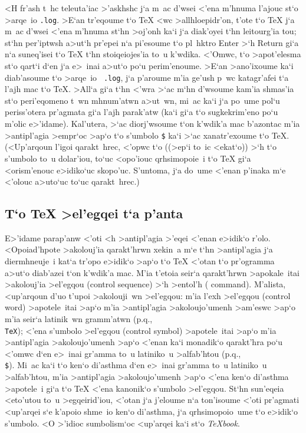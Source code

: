 \noindent
<H fr'ash t~hc teleuta'iac >'askhshc j`a m~ac d'wsei <'ena m'hnuma
l'ajouc st`o >arqe~io  {\tt .log}. >E`an tr'eqoume t`o {\rm \TeX} <wc
>allhloepidr'on, t'ote t`o {\rm \TeX} j`a m~ac d'wsei <'ena m'hnuma
st`hn >oj'onh ka`i j`a diak'oyei t`hn leitour\-g'ia tou; st`hn
per'iptwsh a>ut`h pr'epei n`a pi'esoume t`o pl~h\-ktro {\rm Enter} >`h 
{\rm Return} gi`a n`a suneq'isei t`o {\rm \TeX} t`hn stoiqeiojes'ia to~u
k'wdika.  <'Omwc, t`o >apot'elesma st`o qart`i d`en j`a e>~inai a>ut`o
po`u perim'enoume.  >E`an >ano'ixoume ka`i diab'asoume t`o >arqe~io {\tt
.log}, j`a p'aroume m'ia ge'ush p~wc katagr'afei t`a l'ajh mac t`o {\rm
\TeX}\null. >All`a gi`a t`hn <'wra >`ac m`hn d'wsoume kam'ia shmas'ia
st`o peri'e\-qomeno t~wn mhnum'atwn a>ut~wn, mi~ac ka`i j`a po~ume pol`u
periss'otera pr'agmata gi`a l'ajh parak'atw (ka`i gi`a t`o sugkekrim'eno
po`u m'olic e>'idame). Kal'utera, >`ac diorj'wsoume t`on k'wdik'a mac
b'azontac m'ia >anti\-pl'a\-gia >empr`oc >ap`o t`o s'umbolo {\tt \$}
ka`i >`ac xanatr'exoume t`o {\rm \TeX}\null. (<Up'arqoun l'igoi
qara\-kt~hrec, <'opwc t`o ((>ep`i to~ic <ekat`o)) >`h t`o s'umbolo to~u
dolar'iou, to`uc <opo'iouc qrhsi\-mopoie~i t`o {\rm \TeX} gi`a
<orism'enouc e>idiko`uc skopo'uc.  S'untoma, j`a do~ume <'enan
p'inaka m`e <'olouc a>uto`uc to`uc qarakt~hrec.)
\toindex{\$}

\subsection{T`o {\lsecfont \TeX} >el'egqei t`a p'anta}

E>'idame parap'anw <'oti <h >antipl'agia >'eqei <'enan e>idik`o r'olo.  
<Opoia\-d'hpote >akolouj'ia qa\-ra\-kt'hrwn xekin~a m`e t`hn
>antipl'agia j`a diermhneuje~i kat`a tr'opo e>idik`o >ap`o t`o {\rm
\TeX} <'otan t`o pr'ogramma a>ut`o diab'azei t`on k'wdik'a mac.  M'ia
t'etoia seir`a qarakt'hrwn >apokale~itai {\tengs >ako\-louj'ia
>el'egqou\/} ({\rm control sequence}) >`h {\tengs >entol'h\/} ({\rm
command}).  M'alista, <up'arqoun d'uo t'upoi >ako\-louji~wn >el'egqou:
m'ia {\tengs l'exh >el'egqou\/} ({\rm control word}) >apotele~itai >ap`o
m'ia >anti\-pl'a\-gia >ako\-lou\-jo'u\-menh >am'eswc >ap`o m'ia seir`a
latinik~wn gramm'atwn  (p.q., {\tt \\TeX}); <'ena {\tengs s'umbolo
>el'egqou\/} ({\rm control symbol}) >apotele~itai >ap`o m'ia
>anti\-pl'agia >ako\-lou\-jo'u\-menh >ap`o <'enan  ka`i monadik`o
qarakt'hra po`u <'omwc d`en e>~inai gr'amma to~u latiniko~u >alfab'htou
(p.q., {\tt \\\$})\null.  Mi~ac ka`i t`o ken`o di'a\-sthma d`en e>~inai
gr'amma to~u latiniko~u >alfab'htou, m'ia >antipl'agia
>ako\-lou\-jo'u\-menh >ap`o <'ena ken`o di'asthma >apotele~i gi`a t`o
{\rm \TeX} <'ena kanonik`o s'umbolo >el'egqou.
St`hn sun'eqeia <eto'utou to~u >egqeirid'iou, <'otan j`a j'e\-loume     
n`a ton'isoume <'oti pr'ag\-mati <up'ar\-qei s`e k'apoio shme~io ken`o  
di'asthma, j`a qrhsimopoio~ume t`o e>idik`o s'um\-bolo\NB {\tt\sp}\null.
<O >'idioc sumbolism`oc <up'arqei ka`i st`o {\sl \TeX book}.

